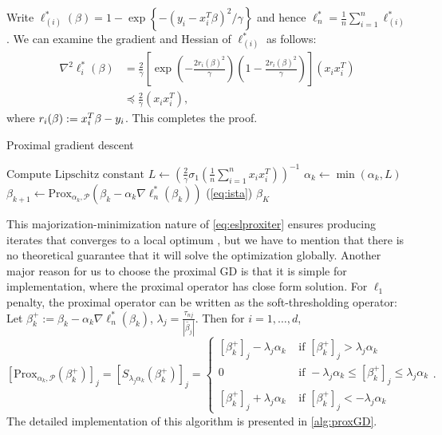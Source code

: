 Write $ \ell_{(i)}^*(\beta) = 1- \exp \left\{ -(y_i- x_i^T\beta)^2/\gamma\right\}$ and hence $\ell_n^* =
\frac{1}{n}\sum_{i=1}^n \ell_{(i)}^*$. We can examine the gradient and Hessian of $\ell_{(i)}^*$ as follows: \[
\begin{aligned} \nabla^2 \ell_i^*(\beta) & = \frac{2}{\gamma} \left[ \exp\left(-\frac{2 r_i(\beta)^2}{\gamma} \right)
\left(1- \frac{2 r_i(\beta)^2}{\gamma} \right)\right] (x_i x_i^T) \\ & \preceq \frac{2}{\gamma} (x_i x_i^T),
\end{aligned} \] where $r_i(\beta):= x_i^T\beta - y_i$. This completes the proof. \eprf


\begin{algorithm}[t!] \caption{Proximal gradient descent} \label{alg:proxGD} \begin{algorithmic}
 \State $\text{Compute Lipschitz
constant } L \gets \left(\frac{2}{\gamma} \sigma_1\left(\frac{1}{n} \sum_{i=1}^n x_i x_i^T \right)\right)^{-1}$
 \State $\alpha_k \gets \min \left(\alpha_k ,L\right)$ \State $\beta_{k+1} \gets
\text{Prox}_{\alpha_k, \mathcal{P}}(\beta_k - \alpha_k \nabla \ell_n^*(\beta_k))$ (\cref{eq:ista}) \EndFor \State
\Return $\beta_K$ \EndProcedure \end{algorithmic} \end{algorithm}

This majorization-minimization nature of \cref{eq:eslproxiter} ensures producing iterates that converges to a local
optimum \citep{hunter2004tutorial}, but we have to mention that there is no theoretical guarantee that it will solve
the optimization globally. Another major reason for us to choose the proximal GD is that it is simple for
implementation, where the proximal operator has close form solution. For $\ell_1$ penalty, the proximal operator can
be written as the soft-thresholding operator: Let $\beta^+_k := \beta_k - \alpha_k \nabla \ell_n^*(\beta_k) $,
$\lambda_j = \frac{\tau_{nj}}{|\tilde{\beta_j}|}$. Then for $i=1, \ldots, d $, \[ \label{eq:ista}
\left[\text{Prox}_{\alpha_k, \mathcal{P}} (\beta^+_k) \right]_j= \left[S_{\lambda_j\alpha_k
}(\beta^+_k)\right]_{j}=\left\{\begin{array}{ll} \left[ \beta^+_k\right]_j-\lambda_j\alpha_k & \text { if } \left[
\beta^+_k\right]_j>\lambda_j \alpha_k \\ 0 & \text { if }-\lambda_j\alpha_k \leq \left[ \beta^+_k\right]_j \leq
\lambda_j\alpha_k \\ \left[ \beta^+_k\right]_j+\lambda_j\alpha_k & \text { if } \left[ \beta^+_k\right]_j<-\lambda_j
\alpha_k \end{array}\right. . \] The detailed implementation of this algorithm is presented in \cref{alg:proxGD}.


